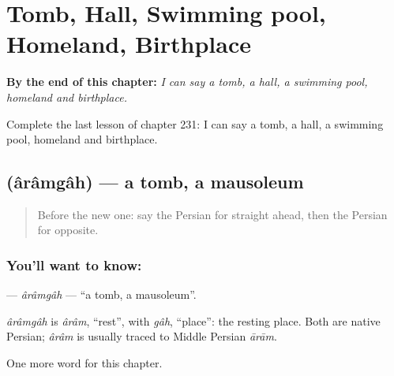 
\chapter{Tomb, Hall, Swimming pool, Homeland, Birthplace}
\label{ch:fa-tomb-hall-swimming-pool-homeland-birthplace}

\begin{chapteropening}
\textbf{By the end of this chapter:} \emph{I can say a tomb, a hall, a swimming pool, homeland and birthplace.}

Complete the last lesson of chapter 231: I can say a tomb, a hall, a swimming pool, homeland and birthplace.
\end{chapteropening}

\section[\texorpdfstring{\fa{آرامگاه} (ârâmgâh)}{آرامگاه (ârâmgâh)}]{ (ârâmgâh) — a tomb, a mausoleum}

\label{lesson:FA-C231-aramgah}



\begin{quote}
Before the new one: say the Persian for straight ahead, then the Persian for opposite.
\end{quote}

\subsection*{You'll want to know: }
\textbf{} — \emph{ârâmgâh} — \textquotedblleft{}a tomb, a mausoleum\textquotedblright{}.

\begin{cousinweb}
\emph{ârâmgâh} is \emph{ârâm}, \textquotedblleft{}rest\textquotedblright{}, with \emph{gâh}, \textquotedblleft{}place\textquotedblright{}: the resting place. Both are native Persian; \emph{ârâm} is usually traced to Middle Persian \emph{ārām}.
\end{cousinweb}

\begin{grammarlens}[title={What you've built}]
One more word for this chapter.
\end{grammarlens}

